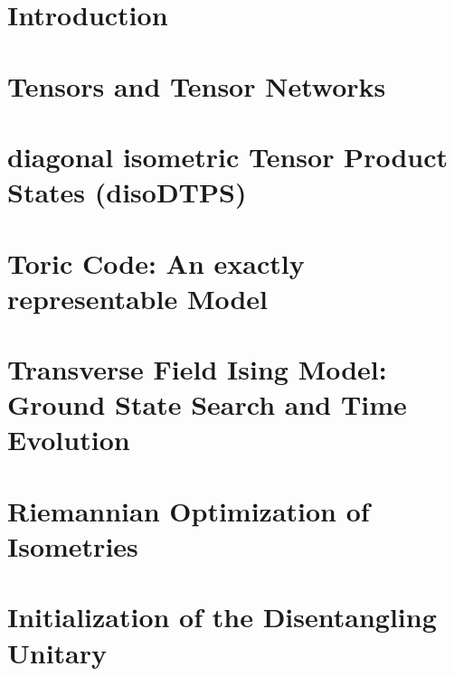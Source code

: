 \documentclass[encoding=utf8,british]{template/thesis}
\begin{document}
	\chapter{Introduction}
	
	\chapter{Tensors and Tensor Networks}
	
	
	\chapter{diagonal isometric Tensor Product States (disoDTPS)}
	
	
	\chapter{Toric Code: An exactly representable Model}
	
	
	\chapter{Transverse Field Ising Model: Ground State Search and Time Evolution}
	
	
	\appendix
	
	\chapter{Riemannian Optimization of Isometries}
	
	
	\chapter{Initialization of the Disentangling Unitary}
	
	\backmatter
	\printbibliography
	
\end{document}
